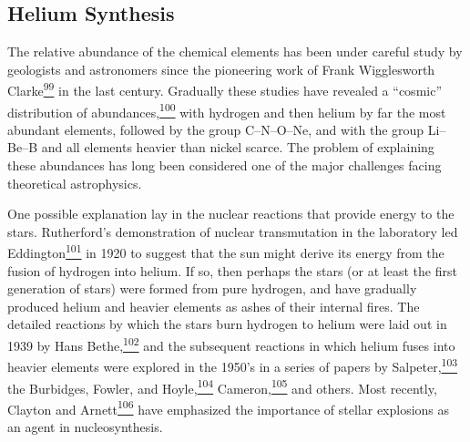 %

\subsection{Helium Synthesis}\label{sec:15.7}

The relative abundance of the chemical elements has been under careful study
by geologists and astronomers since the pioneering work of Frank Wigglesworth
Clarke\hyperref[ch15-ref-99]{\textsuperscript{99}} in the last century.
Gradually these studies have revealed a ``cosmic'' distribution of
abundances,\hyperref[ch15-ref-100]{\textsuperscript{100}} with hydrogen and
then helium by far the most abundant elements, followed by the group
C--N--O--Ne, and with the group Li--Be--B and all elements heavier than nickel
scarce. The problem of explaining these abundances has long been considered
one of the major challenges facing theoretical astrophysics.

One possible explanation lay in the nuclear reactions that provide energy to
the stars. Rutherford's demonstration of nuclear transmutation in the
laboratory led Eddington\hyperref[ch15-ref-101]{\textsuperscript{101}} in
1920 to suggest that the sun might derive its energy from the fusion of
hydrogen into helium. If so, then perhaps the stars (or at least the first
generation of stars) were formed from pure hydrogen, and have gradually
produced helium and heavier elements as ashes of their internal fires. The
detailed reactions by which the stars burn hydrogen to helium were laid out
in 1939 by Hans Bethe,\hyperref[ch15-ref-102]{\textsuperscript{102}} and the
subsequent reactions in which helium fuses into heavier elements were explored
in the 1950's in a series of papers by
Salpeter,\hyperref[ch15-ref-103]{\textsuperscript{103}} the Burbidges,
Fowler, and Hoyle,\hyperref[ch15-ref-104]{\textsuperscript{104}}
Cameron,\hyperref[ch15-ref-105]{\textsuperscript{105}} and others. Most
recently, Clayton and Arnett\hyperref[ch15-ref-106]{\textsuperscript{106}}
have emphasized the importance of stellar explosions as an agent in
nucleosynthesis.

